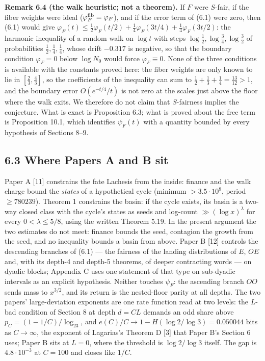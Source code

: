 \documentclass[11pt,a4paper]{article}
\begin{document}
\textbf{Remark 6.4 (the walk heuristic; not a theorem).} If \(F\) were
\(S\)-fair, if the fiber weights were ideal
(\(\varphi^{\rm fib}_F=\varphi_F\)), and if the error term of (6.1) were
zero, then (6.1) would give
\(\varphi_F(t)\le\tfrac12\varphi_F(t/2)+\tfrac14\varphi_F(3t/4)+\tfrac14\varphi_F(3t/2)\):
the harmonic inequality of a random walk on \(\log t\) with steps
\(\log\tfrac12,\log\tfrac34,\log\tfrac32\) of probabilities
\(\tfrac12,\tfrac14,\tfrac14\), whose drift \(-0.317\) is negative, so
that the boundary condition \(\varphi_F=0\) below \(\log N_0\) would
force \(\varphi_F\equiv 0\). None of the three conditions is available
with the constants proved here: the fiber weights are only known to lie
in \([\tfrac23,\tfrac43]\), so the coefficients of the inequality can
sum to \(\tfrac12+\tfrac13+\tfrac14=\tfrac{13}{12}>1\), and the boundary
error \(O(e^{-t/4}/t)\) is not zero at the scales just above the floor
where the walk exits. We therefore do not claim that \(S\)-fairness
implies the conjecture. What is exact is Proposition 6.3; what is proved
about the free term is Proposition 10.1, which identifies \(\psi_F(t)\)
with a quantity bounded by every hypothesis of Sections 8--9.

\subsection{6.3 Where Papers A and B
sit}\label{where-papers-a-and-b-sit}

Paper A {[}11{]} constrains the fate Lachesis from the inside: finance
and the walk charge bound the \emph{states} of a hypothetical cycle
(minimum \(>3.5\cdot 10^8\), period \(\ge 780239\)). Theorem 1
constrains the basin: if the cycle exists, its basin is a two-way closed
class with the cycle's states as seeds and log-count
\(\gg(\log x)^\lambda\) for every \(0<\lambda\le5/8\), using the written
Theorem 5.19. In the present argument the two estimates do not meet:
finance bounds the seed, contagion the growth from the seed, and no
inequality bounds a basin from above. Paper B {[}12{]} controls the
descending branches of (6.1) --- the fairness of the landing
distributions of \(E\), \(OE\) and, with its depth-4 and depth-5
theorems, of deeper contracting words --- on dyadic blocks; Appendix C
uses one statement of that type on sub-dyadic intervals as an explicit
hypothesis. Neither touches \(\psi_F\): the ascending branch \(OO\)
sends mass to \(x^{3/2}\), and its return is the nested-floor parity at
all depths. The two papers' large-deviation exponents are one rate
function read at two levels: the \(L\)-bad condition of Section 8 at
depth \(d=CL\) demands an odd share above \(p_C=(1-1/C)/\log_23\), and
\(e(C)/C\to1-H(\log2/\log3)=0.050044\) bits as \(C\to\infty\), the
exponent of Lagarias's Theorem D {[}3{]} that Paper B's Section 6 uses;
Paper B sits at \(L=0\), where the threshold is \(\log2/\log3\) itself.
The gap is \(4.8\cdot10^{-3}\) at \(C=100\) and closes like \(1/C\).
\end{document}
